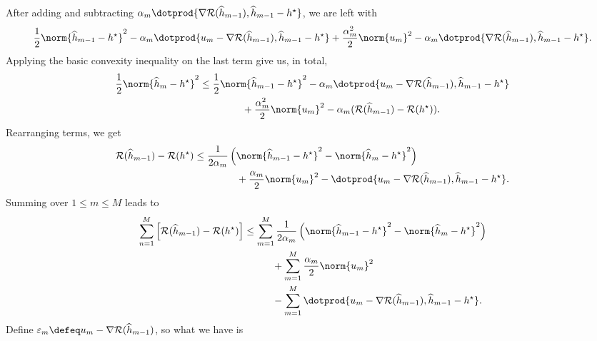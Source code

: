 After adding and subtracting $ \alpha_{ m } \dotprod{ \nabla \risk ( \hat{ h }_{ m-1 } ), \hat{ h }_{ m-1 } - \hstar } $, we are left with
\begin{equation*}
    \frac{ 1 }{ 2 } \norm{ \hat{ h }_{ m-1 } - \hstar }^2
    - \alpha_{ m } \dotprod{ u_{ m } - \nabla \risk ( \hat{ h }_{ m-1 } ), \hat{ h }_{ m-1 } - \hstar }
    + \frac{ \alpha_{ m }^2 }{ 2 } \norm{ u_{ m } }^2
    - \alpha_{ m } \dotprod{ \nabla \risk ( \hat{ h }_{ m-1 } ), \hat{ h }_{ m-1 } - \hstar }
.\end{equation*}
Applying the basic convexity inequality on the last term give us, in total,
\begin{align*}
    \frac{ 1 }{ 2 } \norm{ \hat{ h }_{ m } - \hstar }^2
    &\leq
    \frac{ 1 }{ 2 } \norm{ \hat{ h }_{ m-1 } - \hstar }^2
    - \alpha_{ m } \dotprod{ u_{ m } - \nabla \risk ( \hat{ h }_{ m-1 } ), \hat{ h }_{ m-1 } - \hstar } \\
    &\hspace{1.5cm}
    + \frac{ \alpha_{ m }^2 }{ 2 } \norm{ u_{ m } }^2
    - \alpha_{ m } ( \risk ( \hat{ h }_{ m-1 } ) - \risk ( \hstar ) )
.\end{align*}
Rearranging terms, we get
\begin{align*}
    \risk ( \hat{ h }_{ m-1 } ) - \risk ( \hstar )
    &\leq
    \frac{ 1 }{ 2 \alpha_{ m } } \left(
        \norm{ \hat{ h }_{ m-1 } - \hstar }^2
        -
        \norm{ \hat{ h }_{ m } - \hstar }^2
    \right) \\
    &\hspace{1.5cm}+ \frac{ \alpha_{ m } }{ 2 } \norm{ u_{ m } }^2
    - \dotprod{ u_{ m } - \nabla \risk ( \hat{ h }_{ m-1 } ), \hat{ h }_{ m-1 } - \hstar }
.\end{align*}
Summing over $ 1 \leq m \leq M $ leads to
\begin{align*}
    \sum_{ n=1 }^{ M } \left[
        \risk ( \hat{ h }_{ m-1 } ) - \risk ( \hstar )
    \right]
    &\leq \sum_{ m=1 }^{ M } \frac{ 1 }{ 2 \alpha_{ m } } \left(
        \norm{ \hat{ h }_{ m-1 } - \hstar }^2
        -
        \norm{ \hat{ h }_{ m } - \hstar }^2
    \right) \\
    &\hspace{1cm} + \sum_{ m=1 }^{ M } \frac{ \alpha_{ m } }{ 2 } \norm{ u_{ m } }^2 \\
    &\hspace{1cm} - \sum_{ m=1 }^{ M }
    \dotprod{ u_{ m } - \nabla \risk ( \hat{ h }_{ m-1 } ), \hat{ h }_{ m-1 } - \hstar }
.\end{align*}
Define $ \varepsilon_{ m } \defeq u_{ m } - \nabla \mathcal{R} ( \hat{ h }_{ m-1 } ) $, so what we have is
